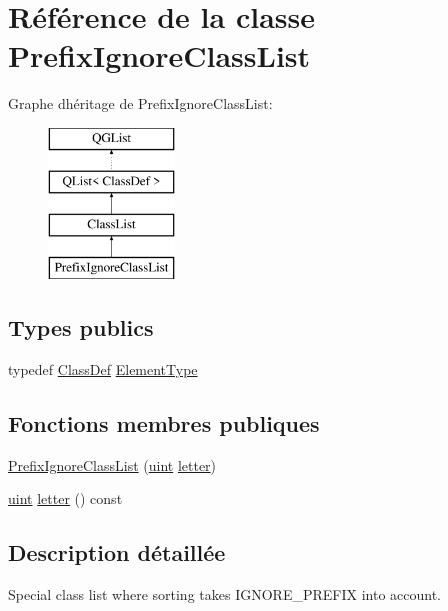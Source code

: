 \hypertarget{class_prefix_ignore_class_list}{}\section{Référence de la classe Prefix\+Ignore\+Class\+List}
\label{class_prefix_ignore_class_list}
Graphe d\textquotesingle{}héritage de Prefix\+Ignore\+Class\+List\+:\begin{figure}[H]
\begin{center}
\leavevmode
\includegraphics[height=4.000000cm]{class_prefix_ignore_class_list}
\end{center}
\end{figure}
\subsection*{Types publics}
\begin{DoxyCompactItemize}
\item 
typedef \hyperlink{class_class_def}{Class\+Def} \hyperlink{class_prefix_ignore_class_list_a2987c6ab03907fefdc45089f4bf1fabd}{Element\+Type}
\end{DoxyCompactItemize}
\subsection*{Fonctions membres publiques}
\begin{DoxyCompactItemize}
\item 
\hyperlink{class_prefix_ignore_class_list_a37620d2982498ae7bad7c15cecd9d8f9}{Prefix\+Ignore\+Class\+List} (\hyperlink{qglobal_8h_a4d3943ddea65db7163a58e6c7e8df95a}{uint} \hyperlink{class_prefix_ignore_class_list_ab5ccf724616b64cdcc108fa71a137e0b}{letter})
\item 
\hyperlink{qglobal_8h_a4d3943ddea65db7163a58e6c7e8df95a}{uint} \hyperlink{class_prefix_ignore_class_list_ab5ccf724616b64cdcc108fa71a137e0b}{letter} () const 
\end{DoxyCompactItemize}


\subsection{Description détaillée}
Special class list where sorting takes I\+G\+N\+O\+R\+E\+\_\+\+P\+R\+E\+F\+I\+X into account. 


